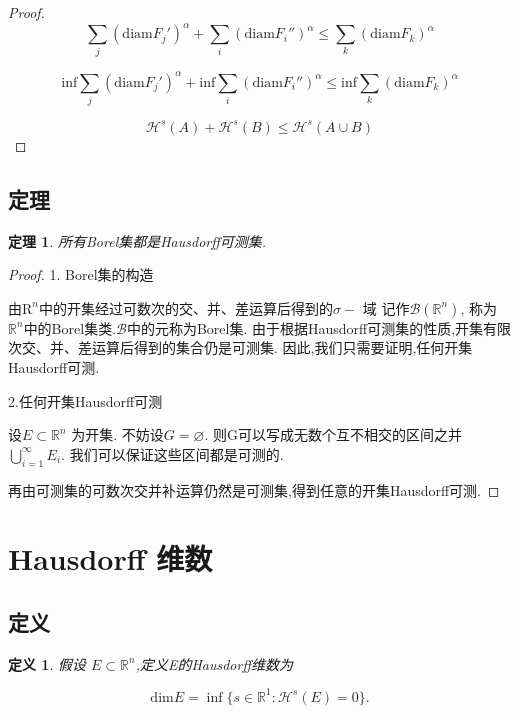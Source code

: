 \documentclass[hyperref,a4paper,UTF8]{ctexart}
\newtheorem{theorem}{定理}[section]
\newtheorem{definition}{定义}[section]
\begin{document}
\begin{enumerate}
\begin{proof}
    \[
      \sum_j (\mathrm{diam} F_j')^{\alpha}+\sum_i (\mathrm{diam} F_i{''})^{\alpha} \leqslant \sum_k (\mathrm{diam} F_k)^{\alpha}
    \]

    \[
      \mathrm{inf} \sum_j (\mathrm{diam} F_j')^{\alpha}+\mathrm{inf}\sum_i (\mathrm{diam} F_i{''})^{\alpha} \leqslant \mathrm{inf}\sum_k (\mathrm{diam} F_k)^{\alpha}
    \]

    \[
        \mathcal{H}^{s}(A)+\mathcal{H}^{s}(B) \leqslant \mathcal{H}^{s}(A \cup B)
    \]



  \end{proof}
\end{enumerate}

\subsection{定理}

\begin{theorem}
  
  所有Borel集都是Hausdorff可测集.

\end{theorem}

\begin{proof}
  1. Borel集的构造

  由$\mathrm{R}^n$中的开集经过可数次的交、并、差运算后得到的$\sigma -$ 域 记作$ \mathcal{B}(\mathbb{R}^n)$,
  称为$\mathbb{R}^n$中的Borel集类.$\mathcal{B}$中的元称为Borel集. 
  由于根据Hausdorff可测集的性质,开集有限次交、并、差运算后得到的集合仍是可测集. 
  因此,我们只需要证明,任何开集Hausdorff可测.

  2.任何开集Hausdorff可测

  设$E \subset \mathbb{R}^n$ 为开集. 不妨设$G = \varnothing $.
  则G可以写成无数个互不相交的区间之并
  $\bigcup\limits_{i=1}^{\infty} E_i$. 我们可以保证这些区间都是可测的. 

  再由可测集的可数次交并补运算仍然是可测集,得到任意的开集Hausdorff可测.

\end{proof}

\section{Hausdorff 维数}

\subsection{定义}
\begin{definition}
  假设 \( E \subset \mathbb{R}^n \),定义E的Hausdorff维数为

  \[
    \mathrm{dim} E = \inf\{s \in \mathbb{R}^1: \mathcal{H}^{s}(E) = 0 \}.
  \]

\end{definition}
\end{document}
